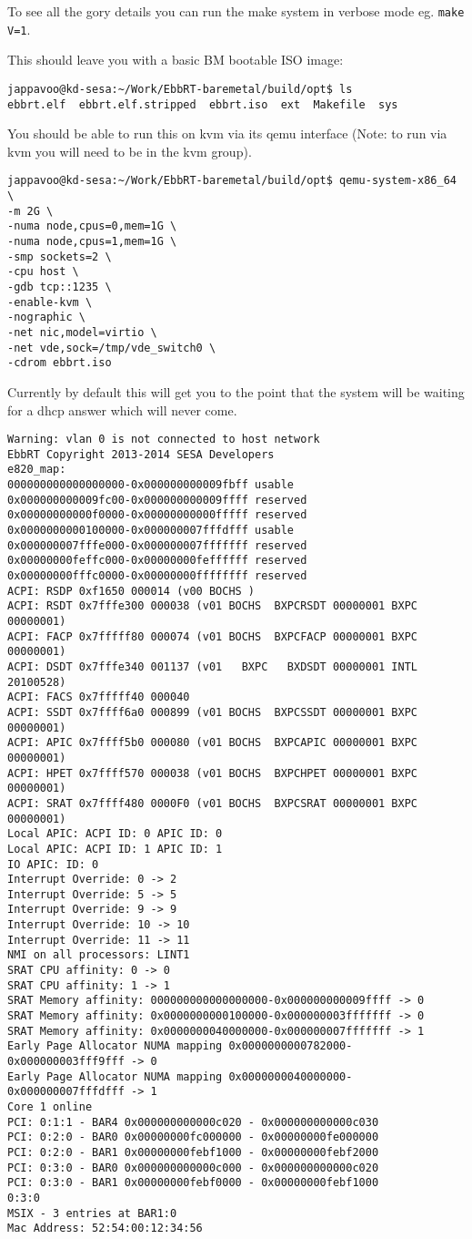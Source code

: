 \documentclass[11pt]{report}
\begin{document}
To see all the gory details you can run the make system in verbose mode eg.
{\tt make V=1}.

This should leave you with a basic BM bootable ISO image:
\begin{verbatim}
jappavoo@kd-sesa:~/Work/EbbRT-baremetal/build/opt$ ls 
ebbrt.elf  ebbrt.elf.stripped  ebbrt.iso  ext  Makefile  sys
\end{verbatim}

\newpage
You should be able to run this on kvm via its qemu interface (Note: to run via kvm you will need to be in the kvm group).
\begin{verbatim}
jappavoo@kd-sesa:~/Work/EbbRT-baremetal/build/opt$ qemu-system-x86_64 \
-m 2G \
-numa node,cpus=0,mem=1G \
-numa node,cpus=1,mem=1G \
-smp sockets=2 \
-cpu host \
-gdb tcp::1235 \
-enable-kvm \
-nographic \
-net nic,model=virtio \
-net vde,sock=/tmp/vde_switch0 \
-cdrom ebbrt.iso
\end{verbatim}

Currently by default this will get you to the point
that the system will be waiting for a dhcp answer which will never come.  

{\tiny
\begin{verbatim}
Warning: vlan 0 is not connected to host network
EbbRT Copyright 2013-2014 SESA Developers
e820_map:
000000000000000000-0x000000000009fbff usable
0x000000000009fc00-0x000000000009ffff reserved
0x00000000000f0000-0x00000000000fffff reserved
0x0000000000100000-0x000000007fffdfff usable
0x000000007fffe000-0x000000007fffffff reserved
0x00000000feffc000-0x00000000feffffff reserved
0x00000000fffc0000-0x00000000ffffffff reserved
ACPI: RSDP 0xf1650 000014 (v00 BOCHS )
ACPI: RSDT 0x7fffe300 000038 (v01 BOCHS  BXPCRSDT 00000001 BXPC 00000001)
ACPI: FACP 0x7fffff80 000074 (v01 BOCHS  BXPCFACP 00000001 BXPC 00000001)
ACPI: DSDT 0x7fffe340 001137 (v01   BXPC   BXDSDT 00000001 INTL 20100528)
ACPI: FACS 0x7fffff40 000040
ACPI: SSDT 0x7ffff6a0 000899 (v01 BOCHS  BXPCSSDT 00000001 BXPC 00000001)
ACPI: APIC 0x7ffff5b0 000080 (v01 BOCHS  BXPCAPIC 00000001 BXPC 00000001)
ACPI: HPET 0x7ffff570 000038 (v01 BOCHS  BXPCHPET 00000001 BXPC 00000001)
ACPI: SRAT 0x7ffff480 0000F0 (v01 BOCHS  BXPCSRAT 00000001 BXPC 00000001)
Local APIC: ACPI ID: 0 APIC ID: 0
Local APIC: ACPI ID: 1 APIC ID: 1
IO APIC: ID: 0
Interrupt Override: 0 -> 2
Interrupt Override: 5 -> 5
Interrupt Override: 9 -> 9
Interrupt Override: 10 -> 10
Interrupt Override: 11 -> 11
NMI on all processors: LINT1
SRAT CPU affinity: 0 -> 0
SRAT CPU affinity: 1 -> 1
SRAT Memory affinity: 000000000000000000-0x000000000009ffff -> 0
SRAT Memory affinity: 0x0000000000100000-0x000000003fffffff -> 0
SRAT Memory affinity: 0x0000000040000000-0x000000007fffffff -> 1
Early Page Allocator NUMA mapping 0x0000000000782000-0x000000003fff9fff -> 0
Early Page Allocator NUMA mapping 0x0000000040000000-0x000000007fffdfff -> 1
Core 1 online
PCI: 0:1:1 - BAR4 0x000000000000c020 - 0x000000000000c030
PCI: 0:2:0 - BAR0 0x00000000fc000000 - 0x00000000fe000000
PCI: 0:2:0 - BAR1 0x00000000febf1000 - 0x00000000febf2000
PCI: 0:3:0 - BAR0 0x000000000000c000 - 0x000000000000c020
PCI: 0:3:0 - BAR1 0x00000000febf0000 - 0x00000000febf1000
0:3:0
MSIX - 3 entries at BAR1:0
Mac Address: 52:54:00:12:34:56
\end{verbatim}
}
\end{document}
